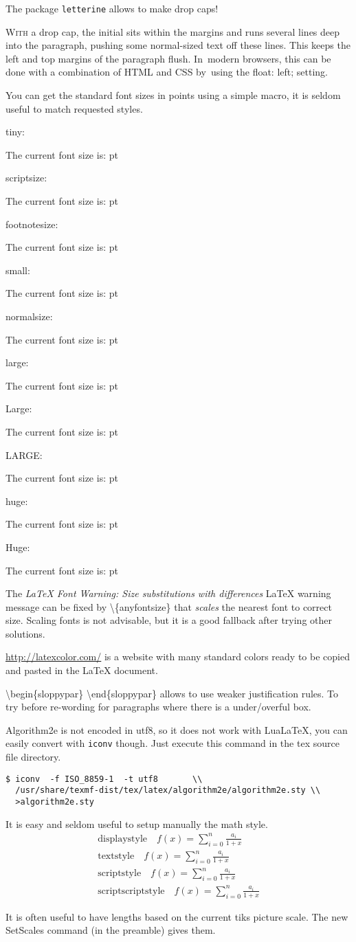 \documentclass[a4paper]{article}
\makeatletter
\newlength{\scaledx}
\newlength{\scaledy}
\newcommand\SetScales{%
  \pgfpointxy{1}{1}%
  \pgfextractx{\scaledx}{}%
  \pgfextracty{\scaledy}{}%
}
\newcommand\thefontsize[1]{{#1 The current font size is: \f@size pt\par}}
\makeatother
\begin{document}
\vskip5mm
The package \texttt{letterine} allows to make drop caps!

\lettrine[lines=3,slope=-4pt,nindent=-4pt,findent=2pt]{W}{ith} a drop cap, the initial sits
within the margins and runs several lines deep into the paragraph, pushing some
normal-sized text off these lines. This keeps the left and top margins of the
paragraph flush.  In~modern browsers, this can be done with a combination of
HTML and CSS by~using the float: left; setting.

You can get the standard font sizes in points using a simple macro, it is
seldom useful to match requested styles.

tiny: \thefontsize\tiny
scriptsize: \thefontsize\scriptsize
footnotesize: \thefontsize\footnotesize
small: \thefontsize\small
normalsize: \thefontsize\normalsize
large: \thefontsize\large
Large: \thefontsize\Large
LARGE: \thefontsize\LARGE
huge: \thefontsize\huge
Huge: \thefontsize\Huge


The \emph{LaTeX Font Warning: Size substitutions with differences} \LaTeX{}
warning message can be fixed by \textbackslash{}\{anyfontsize\} that
\emph{scales} the nearest font to correct size. Scaling fonts is not advisable,
but it is a good fallback after trying other solutions.



\url{http://latexcolor.com/} is a website with many standard colors ready to be copied
and pasted in the \LaTeX{} document.

\textbackslash{}begin\{sloppypar\} \textbackslash{}end\{sloppypar\} allows to
use weaker justification rules. To try before re-wording for paragraphs where
there is a under/overful box.

Algorithm2e is not encoded in utf8, so it does not work with LuaLaTeX, you can
easily convert with \texttt{iconv} though. Just execute this command in the tex
source file directory.
\begin{verbatim}
$ iconv  -f ISO_8859-1  -t utf8       \\
  /usr/share/texmf-dist/tex/latex/algorithm2e/algorithm2e.sty \\
  >algorithm2e.sty
\end{verbatim}

It is easy and seldom useful to setup manually the math style.
\begin{eqnarray*}
\mathrm{displaystyle}\quad      \displaystyle      f(x) = \sum_{i=0}^{n} \frac{a_i}{1+x} \\
\mathrm{textstyle}\quad         \textstyle         f(x) = \sum_{i=0}^{n} \frac{a_i}{1+x} \\
\mathrm{scriptstyle}\quad       \scriptstyle       f(x) = \sum_{i=0}^{n} \frac{a_i}{1+x} \\
\mathrm{scriptscriptstyle}\quad \scriptscriptstyle f(x) = \sum_{i=0}^{n} \frac{a_i}{1+x}
\end{eqnarray*}


It is often useful to have lengths based on the current tiks picture scale.  The
new SetScales command (in the preamble) gives them.

\end{document}
